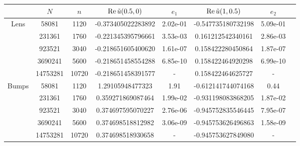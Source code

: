\documentclass[11pt,final]{amsart}
\theoremstyle{definition}
\numberwithin{remark}{section}
\numberwithin{definition}{section}
\numberwithin{pro}{section}
\begin{document}
\begin{table}[ht]
 \begin{tabular}{|c|c|c|c|c|c|c|c|}
\hline
&  $N$& $n$&  $\operatorname{Re}\tilde{u}(0.5,0)$ &$e_1$ &$\operatorname{Re}\tilde{u}(1,0.5)$ &$e_2$\\ \hline
\multirow{5}{*}{Lens}%
		    &58081&1120&-0.373405022283892&	2.02e-01	&-0.547735180732198&5.09e-01\\
		    &231361&1760& -0.221345395796661&3.53e-03	&0.161212542340161& 2.86e-03	\\
		    &923521&3040&-0.218651605400620&1.61e-07	& 0.158422280450864& 1.87e-07\\
		    &3690241& 5600&  -0.218651458554288& 6.85e-10	&0.158422464920298&	6.99e-10\\
		    &14753281& 10720&  -0.218651458391577& - & 0.158422464625727 & - \\
\hline
\multirow{5}{*}{Bumps}%
		    &58081&1120&1.29105948477323 &     1.91         &-0.612141744074168 &0.44 	\\
		    &231361&1760&0.359271869087464& 	1.99e-02	&-0.931198083868205& 1.87e-02\\
		    &923521&3040&0.374697595070227&	2.76e-06&-0.945752835546445& 7.95e-07\\
		    &3690241& 5600&0.374698518812982&	3.06e-09&-0.945753626496863& 1.58e-09 \\
		    &14753281& 10720& 0.374698518930658& -	&-0.945753627849080 &- \\ \hline


\end{tabular}
\end{table}
\end{document}
